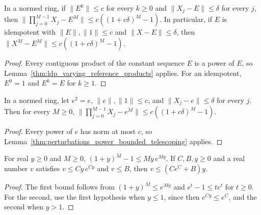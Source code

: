 \begin{lemma}
    \label{thm:perturbations_power_bounded_telescoping}
    \leanok
    In a normed ring, if $\lVert E^k\rVert\le c$ for every $k\ge0$ and
    $\lVert X_j-E\rVert\le\delta$ for every $j$, then
    $\lVert\prod_{j=0}^{M-1}X_j-E^M\rVert\le c((1+c\delta)^M-1)$. In
    particular, if $E$ is idempotent with $\lVert E\rVert,\lVert1\rVert\le c$
    and $\lVert X-E\rVert\le\delta$, then
    $\lVert X^M-E^M\rVert\le c((1+c\delta)^M-1)$.
\end{lemma}
\begin{proof}\leanok
    Every contiguous product of the constant sequence $E$ is a power of $E$, so
    Lemma~\ref{thm:ldp_varying_reference_products} applies. For an idempotent,
    $E^0=1$ and $E^k=E$ for $k\ge1$.
\end{proof}

\begin{lemma}
    \label{thm:ldp_ordered_telescoping_bound}
    \leanok
    In a normed ring, let $e^2=e$, $\lVert e\rVert,\lVert1\rVert\le c$, and
    $\lVert X_j-e\rVert\le\delta$ for every $j$. Then for every $M\ge0$,
    $\lVert\prod_{j=0}^{M-1}X_j-e^M\rVert
        \le c((1+c\delta)^M-1)$.
\end{lemma}
\begin{proof}\leanok
    Every power of $e$ has norm at most $c$, so
    Lemma~\ref{thm:perturbations_power_bounded_telescoping} applies.
\end{proof}

\begin{lemma}
    \label{lem:perturbations_exponential_bounds}
    \leanok
    For real $y\ge0$ and $M\ge0$, $(1+y)^M-1\le My\,e^{My}$. If $C,B,y\ge0$
    and a real number $v$ satisfies $v\le Cy\,e^{Cy}$ and $v\le B$, then
    $v\le(Ce^C+B)y$.
\end{lemma}
\begin{proof}\leanok
    The first bound follows from $(1+y)^M\le e^{My}$ and
    $e^{t}-1\le te^{t}$ for $t\ge0$. For the second, use the first hypothesis
    when $y\le1$, since then $e^{Cy}\le e^C$, and the second when $y>1$.
\end{proof}

